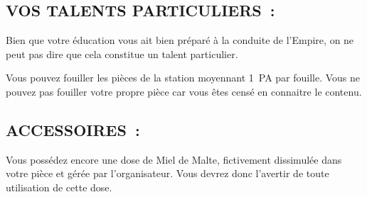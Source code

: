 \documentclass[14pt,twocolumn]{extarticle}
\begin{document}
\subsection{VOS TALENTS PARTICULIERS~:}

Bien que votre éducation vous ait bien préparé à la conduite de l'Empire, on
ne peut pas dire que cela constitue un talent particulier.

Vous pouvez fouiller les pièces de la station moyennant 1~PA par fouille. Vous
ne pouvez pas fouiller votre propre pièce car vous êtes censé en connaitre le
contenu.

\subsection{ACCESSOIRES~:}

Vous possédez encore une dose de Miel de Malte, fictivement dissimulée dans
votre pièce et gérée par l'organisateur. Vous devrez donc l'avertir de toute
utilisation de cette dose.
\end{document}
